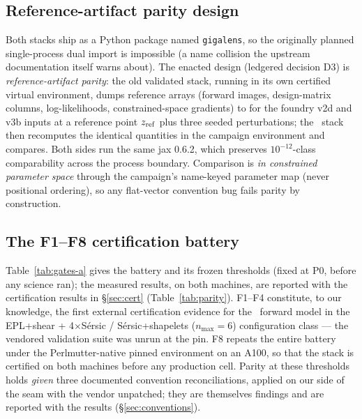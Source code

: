 \subsection{Reference-artifact parity design}

Both stacks ship as a Python package named \texttt{gigalens}, so the
originally planned single-process dual import is impossible (a name
collision the upstream documentation itself warns about). The enacted
design (ledgered decision D3) is \emph{reference-artifact parity}: the old
validated stack, running in its own certified virtual environment, dumps
reference arrays (forward images, design-matrix columns, log-likelihoods,
constrained-space gradients) to  for the
foundry v2d and v3b inputs at a reference point $z_{\rm ref}$ plus three
seeded perturbations; the \sceneapi\ stack then recomputes the identical
quantities in the campaign environment and compares. Both sides run the
same jax 0.6.2, which preserves $10^{-12}$-class comparability across the
process boundary. Comparison is \emph{in constrained parameter space}
through the campaign's name-keyed parameter map (never positional
ordering), so any flat-vector convention bug fails parity by construction.

\subsection{The F1--F8 certification battery}

Table~\ref{tab:gates-a} gives the battery and its frozen thresholds
(fixed at P0, before any science ran); the measured results, on both
machines, are reported with the certification results in \S\ref{sec:cert}
(Table~\ref{tab:parity}). F1--F4 constitute, to our knowledge, the first
external certification evidence for the \sceneapi\ forward model in the
EPL+shear + 4$\times$S\'ersic / S\'ersic+shapelets ($n_{\max}=6$)
configuration class --- the vendored validation suite was unrun at the
pin. F8 repeats the entire battery under the Perlmutter-native pinned
environment on an A100, so that the stack is certified on both machines
before any production cell. Parity at these thresholds holds \emph{given}
three documented convention reconciliations, applied on our side of the
seam with the vendor unpatched; they are themselves findings and are
reported with the results (\S\ref{sec:conventions}).

